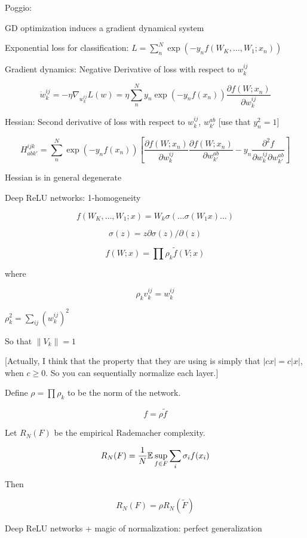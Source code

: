 \documentclass[english]{article}
\begin{document}
\item Poggio:

\benum
\item GD optimization induces a gradient dynamical system

\item Exponential loss for classification: $L  = \sum_n^N \exp(-y_n f(W_K,\ldots, W_1; x_n))$

Gradient dynamics: Negative Derivative of loss with respect to $w_k^{ij}$ 

$$
\dot w_k^{ij} 
= 
-\eta \nabla_{w_k^{ij}} L(w)
=
\eta
\sum_n^N y_n\exp(-y_n f(x_n))
\frac{\partial f(W;x_n)}{\partial w_k^{ij}}
$$

Hessian: Second derivative of loss with respect to $w_k^{ij}$, $w_{k'}^{ab}$  [use that $y_n^2=1$]

$$
H_{abk'}^{ijk}
= 
\sum_n^N \exp(-y_n f(x_n))
[
\frac{\partial f(W;x_n)}{\partial w_k^{ij}}
\frac{\partial f(W;x_n)}{\partial w_{k'}^{ab}}
-
y_n\frac{\partial^2f}{\partial w_k^{ij}\partial w_{k'}^{ab}}
]
$$

Hessian is in general degenerate

\item Deep ReLU networks: 1-homogeneity

$$f(W_K,\ldots, W_1; x) = W_k \sigma(\ldots \sigma (W_1x)\ldots)$$

$$\sigma(z) = z \partial \sigma(z)/\partial(z)$$

$$f(W;x) = \prod \rho_k \tilde f(V;x)$$

where 

$$\rho_k v_k^{ij} = w_k^{ij}$$

$\rho_k^2 = \sum_{ij} (w_k^{ij})^2$

So that $\|V_k\|=1$%

[Actually, I think that the property that they are using is simply that $|cx|=c|x|$, when $c\ge 0$. So you can sequentially normalize each layer.]

Define $\rho = \prod \rho_k$ to be the norm of the network.

$$f = \rho \tilde f$$

Let $R_N(F)$ be the empirical Rademacher complexity. 

$$R_N(F) = \frac1N \mathbb{E} \sup_{f\in F} \sum_i \sigma_if(x_i)$$

Then

$$R_N(F) = \rho R_N(\tilde F)$$


\item Deep ReLU networks + magic of normalization: perfect generalization
\end{document}
